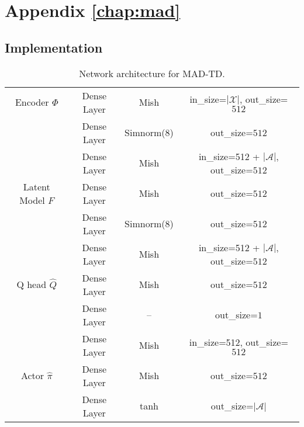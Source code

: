 \chapter{Appendix \autoref{chap:mad}}


\section{Implementation}
\label{app:implementation}

\begin{table}
\begin{center}
\begin{tabular}{c|c|c|c}
     Encoder $\Phi$ & Dense Layer & Mish & in\_size=$|\mathcal{X}|$, out\_size=$512$ \\
     & Dense Layer & Simnorm(8) & out\_size=$512$\\\hline
     
     & Dense Layer & Mish &in\_size=512 + $|\mathcal{A}|$, out\_size=$512$ \\
     Latent Model $F$ & Dense Layer & Mish & out\_size=$512$\\\
     & Dense Layer & Simnorm(8) &out\_size=$512$\\\hline
     
     & Dense Layer & Mish &in\_size=512 + $|\mathcal{A}|$, out\_size=$512$ \\
     Q head $\hat{Q}$& Dense Layer & Mish & out\_size=$512$\\
     & Dense Layer & -- & out\_size=$1$\\\hline

     & Dense Layer & Mish &in\_size=512, out\_size=$512$ \\
     Actor $\hat{\pi}$& Dense Layer & Mish & out\_size=$512$\\
     & Dense Layer & tanh & out\_size=$|\mathcal{A}|$
\end{tabular}
\end{center}
\caption{Network architecture for MAD-TD.}
\label{tab:arch}
\end{table}

